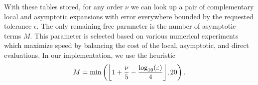 With these tables stored, for any order $\nu$ we can look up a pair of
complementary local and asymptotic expansions with error everywhere bounded by
the requested tolerance $\epsilon$. The only remaining free parameter is the
number of asymptotic terms $M$. This parameter is selected based on various
numerical experiments which maximize speed by balancing the cost of the local,
asymptotic, and direct evaluations. In our implementation, we use the heuristic
\begin{equation}
  \label{eq:num-asy-terms}
    M = \min\left(\flr{1 + \frac{\nu}{5} - \frac{\log_{10}(\epsilon)}{4}}, 20\right).
\end{equation}




